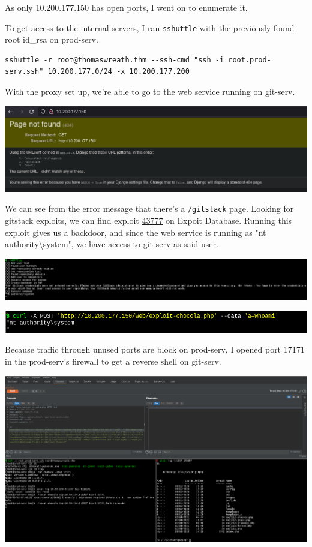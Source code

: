 As only 10.200.177.150 has open ports, I went on to enumerate it.

To get access to the internal servers, I ran \lstinline{sshuttle} with the previously found root id\_rsa on prod-serv.

\begin{lstlisting}[basicstyle=\footnotesize]
sshuttle -r root@thomaswreath.thm --ssh-cmd "ssh -i root.prod-serv.ssh" 10.200.177.0/24 -x 10.200.177.200
\end{lstlisting}

With the proxy set up, we're able to go to the web service running on git-serv.

\includegraphics[width=\textwidth]{img/150-home.png}

We can see from the error message that there's a \lstinline{/gitstack} page. Looking for gitstack exploits, we can find exploit \href{https://www.exploit-db.com/exploits/43777}{43777} on Expoit Database. Running this exploit gives us a backdoor, and since the web service is running as "nt authority\textbackslash system", we have access to git-serv as said user.

\includegraphics[width=\textwidth]{img/exploit-43777.py.png}

\includegraphics[width=\textwidth]{img/backdoor-43777.py.png}

Because traffic through unused ports are block on prod-serv, I opened port 17171 in the prod-serv's firewall to get a reverse shell on git-serv.

\includegraphics[width=\textwidth]{img/150-revshell.png}

